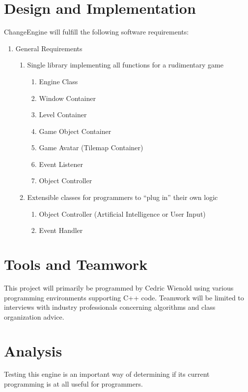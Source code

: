 \documentclass[12pt]{article}
\begin{document}
  \section{Design and Implementation}
    ChangeEngine will fulfill the following software requirements:

\begin{enumerate}
  \item General Requirements

  \begin{enumerate}
    \item Single library implementing all functions for a rudimentary game

    \begin{enumerate}
      \item Engine Class
      \item Window Container
      \item Level Container
      \item Game Object Container
      \item Game Avatar (Tilemap Container)
      \item Event Listener
      \item Object Controller
    \end{enumerate}

    \item Extensible classes for programmers to ``plug in'' their own logic

    \begin{enumerate}
      \item Object Controller (Artificial Intelligence or User Input)
      \item Event Handler
    \end{enumerate}

  \end{enumerate}

\end{enumerate}

  \section{Tools and Teamwork}
    This project will primarily be programmed by Cedric Wienold using various programming environments supporting C++ code. Teamwork will be limited to interviews with industry professionals concerning algorithms and class organization advice.

  \section{Analysis}
    Testing this engine is an important way of determining if its current programming is at all useful for programmers.
\end{document}
